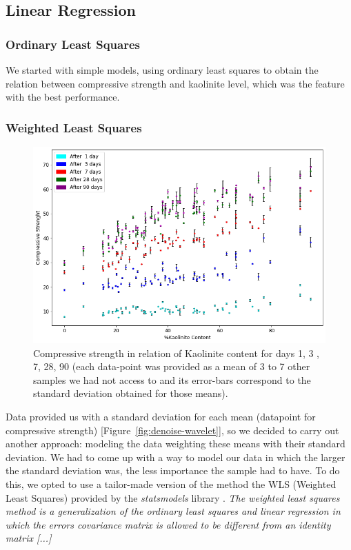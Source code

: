 \documentclass[10pt,conference,compsocconf]{IEEEtran}
\begin{document}
\subsection{Linear Regression}
\subsubsection{Ordinary Least Squares}
We started with simple models, using ordinary least squares to obtain the relation between compressive strength and kaolinite level, which was the feature with the best performance.
\subsubsection{Weighted Least Squares}
\begin{figure}[tbp]
  \centering
  \includegraphics[width=\textwidth]{figures/cstrength-std.png}
  \caption{Compressive strength in relation of Kaolinite content for days 1, 3 , 7, 28, 90 (each data-point was provided as a mean of 3 to 7 other samples we had not access to and its error-bars correspond to the standard deviation obtained for those means). }
  \vspace{-3mm}
  \label{fig:cstrength-std}
\end{figure}
Data provided us with a standard deviation for each mean (datapoint for compressive strength) [Figure~\ref{fig:denoise-wavelet}], so we decided to carry out another approach: modeling the data weighting these means with their standard deviation. We had to come up with a way to model our data in which the larger the standard deviation was, the less importance the sample had to have. 
To do this, we opted to use a tailor-made version of the method the WLS (Weighted Least Squares) provided by the \textit{statsmodels} library \cite{sm:wls}. \textit{The weighted least squares method is a generalization of the ordinary least squares and linear regression in which the errors covariance matrix is allowed to be different from an identity matrix [...]}
\end{document}
